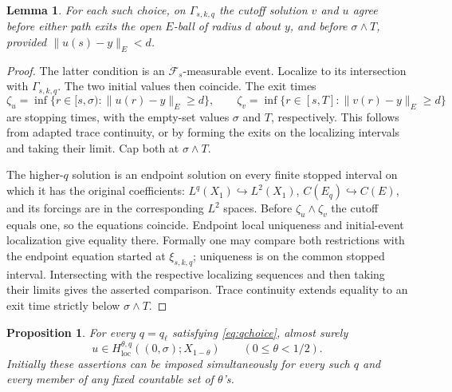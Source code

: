 \documentclass[11pt]{amsart}
\newtheorem{lemma}[theorem]{Lemma}
\newtheorem{proposition}[theorem]{Proposition}
\theoremstyle{definition}
\theoremstyle{remark}
\newcommand{\loc}{\mathrm{loc}}
\newcommand{\norm}[2][]{\lVert #2\rVert_{#1}}
\numberwithin{equation}{section}
\begin{document}
\begin{lemma}\label{lem:comparison}
For each such choice, on $\Gamma_{s,k,q}$ the cutoff solution $v$ and
$u$ agree before either path exits the open $E$-ball of radius $d$
about $y$, and before $\sigma\wedge T$, provided
$\norm[E]{u(s)-y}<d$.
\end{lemma}

\begin{proof}
The latter condition is an $\mathcal F_s$-measurable event. Localize
to its intersection with $\Gamma_{s,k,q}$. The two initial values
then coincide. The exit times
\[
 \zeta_u=\inf\{r\in[s,\sigma):\norm[E]{u(r)-y}\ge d\},\qquad
 \zeta_v=\inf\{r\in[s,T]:\norm[E]{v(r)-y}\ge d\}
\]
are stopping times, with the empty-set values $\sigma$ and $T$,
respectively. This follows from adapted trace continuity, or by
forming the exits on the localizing intervals and taking their limit.
Cap both at $\sigma\wedge T$.

The higher-$q$ solution is an endpoint solution on every finite
stopped interval on which it has the original coefficients:
$L^q(X_1)\hookrightarrow L^2(X_1)$, $C(E_q)\hookrightarrow C(E)$,
and its forcings are in the corresponding $L^2$ spaces.
Before $\zeta_u\wedge\zeta_v$ the cutoff equals one, so the
equations coincide. Endpoint local uniqueness and initial-event
localization give equality there. Formally one may compare both
restrictions with the endpoint equation started at $\xi_{s,k,q}$;
uniqueness is on the common stopped interval. Intersecting with
the respective localizing sequences and then taking their limits
gives the asserted comparison. Trace continuity extends equality
to an exit time strictly below $\sigma\wedge T$.
\end{proof}

\begin{proposition}\label{prop:cover}
For every $q=q_\ell$ satisfying \eqref{eq:qchoice}, almost surely
\begin{equation}\label{eq:highq}
 u\in H^{\theta,q}_\loc((0,\sigma);X_{1-\theta})
 \qquad(0\le\theta<1/2).
\end{equation}
Initially these assertions can be imposed simultaneously for every such
$q$ and every member of any fixed countable set of $\theta$'s.
\end{proposition}
\end{document}
